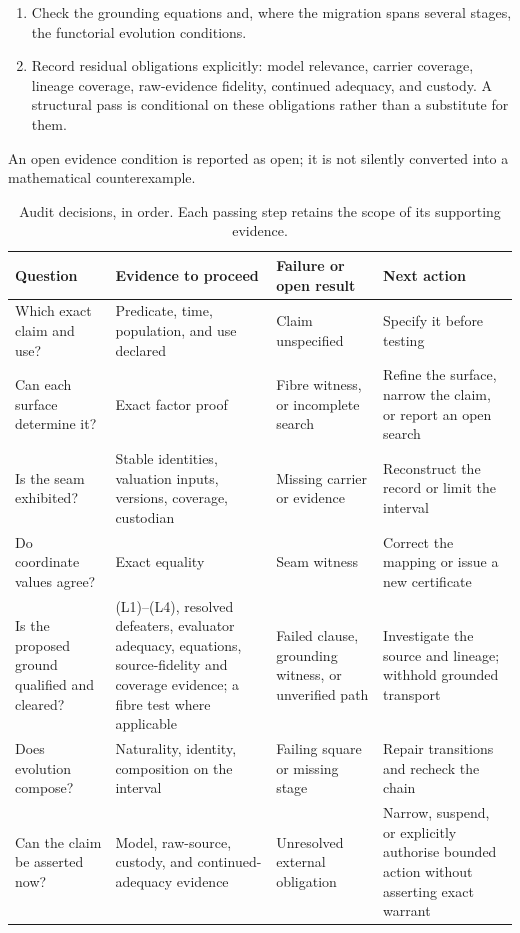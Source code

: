 \documentclass[smallextended,envcountsect,envcountsame,natbib]{svjour3}
\begin{document}
\begin{enumerate}
\item Check the grounding equations and, where the migration spans several stages, the functorial evolution conditions.
\item Record residual obligations explicitly: model relevance, carrier coverage, lineage coverage, raw-evidence fidelity, continued adequacy, and custody. A structural pass is conditional on these obligations rather than a substitute for them.
\end{enumerate}

An open evidence condition is reported as open; it is not silently converted into a mathematical counterexample.

\begin{table}[htbp]
\centering\footnotesize
\caption{Audit decisions, in order. Each passing step retains the scope of its supporting evidence.}
\label{ex:tab:audit-decisions}
\begin{tabularx}{\textwidth}{@{}p{2.5cm}LLL@{}}
\toprule
Question & Evidence to proceed & Failure or open result & Next action \\
\midrule
Which exact claim and use? & Predicate, time, population, and use declared & Claim unspecified & Specify it before testing \\
Can each surface determine it? & Exact factor proof & Fibre witness, or incomplete search & Refine the surface, narrow the claim, or report an open search \\
Is the seam exhibited? & Stable identities, valuation inputs, versions, coverage, custodian & Missing carrier or evidence & Reconstruct the record or limit the interval \\
Do coordinate values agree? & Exact equality & Seam witness & Correct the mapping or issue a new certificate \\
Is the proposed ground qualified and cleared? & (L1)--(L4), resolved defeaters, evaluator adequacy, equations, source-fidelity and coverage evidence; a fibre test where applicable & Failed clause, grounding witness, or unverified path & Investigate the source and lineage; withhold grounded transport \\
Does evolution compose? & Naturality, identity, composition on the interval & Failing square or missing stage & Repair transitions and recheck the chain \\
Can the claim be asserted now? & Model, raw-source, custody, and continued-adequacy evidence & Unresolved external obligation & Narrow, suspend, or explicitly authorise bounded action without asserting exact warrant \\
\bottomrule
\end{tabularx}
\end{table}
\end{document}
